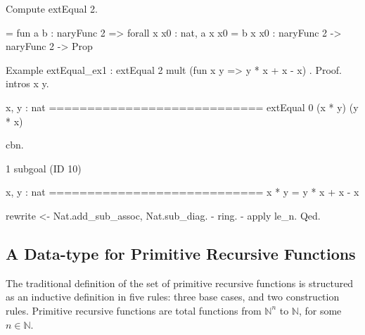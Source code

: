 \begin{Coqsrc}
Compute extEqual 2.
\end{Coqsrc}

\begin{Coqanswer}
     = fun a b : naryFunc 2 => forall x x0 : nat, a x x0 = b x x0
     : naryFunc 2 -> naryFunc 2 -> Prop
 \end{Coqanswer}
 
\begin{Coqsrc}
Example extEqual_ex1 : extEqual 2 mult (fun x y =>  y * x + x - x) .
Proof.
  intros x y.
\end{Coqsrc}

\begin{Coqanswer}
  x, y : nat
  ============================
  extEqual 0 (x * y) (y * x)
\end{Coqanswer}

\begin{Coqsrc}
  cbn.
\end{Coqsrc}

\begin{Coqanswer}
1 subgoal (ID 10)
  
  x, y : nat
  ============================
  x * y = y * x + x - x
\end{Coqanswer}

\begin{Coqsrc}
  rewrite <- Nat.add_sub_assoc, Nat.sub_diag.
  - ring.
  - apply le_n.  
Qed.
\end{Coqsrc}

\subsection{A Data-type for Primitive Recursive Functions}

The traditional definition of the set of primitive recursive functions is structured as an inductive definition 
in five rules: three base cases, and two construction rules. Primitive recursive functions are total functions from $\mathbb{N}^n$ to
$\mathbb{N}$, for some $n\in\mathbb{N}$.

